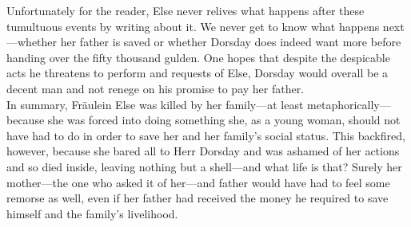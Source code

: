 \documentclass[12pt,a4paper]{article}
\begin{document}
Unfortunately for the reader, Else never relives what happens after these tumultuous events by writing about it. We never get to know what happens next---whether her father is saved or whether Dorsday does indeed want more before handing over the fifty thousand gulden. One hopes that despite the despicable acts he threatens to perform and requests of Else, Dorsday would overall be a decent man and not renege on his promise to pay her father.\\

In summary, Fr\"{a}ulein Else was killed by her family---at least metaphorically---because she was forced into doing something she, as a young woman, should not have had to do in order to save her and her family's social status. This backfired, however, because she bared all to Herr Dorsday and was ashamed of her actions and so died inside, leaving nothing but a shell---and what life is that? Surely her mother---the one who asked it of her---and father would have had to feel some remorse as well, even if her father had received the money he required to save himself and the family's livelihood.
\end{document}
